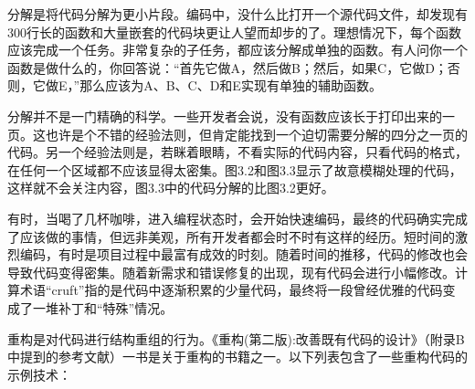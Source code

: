 
分解是将代码分解为更小片段。编码中，没什么比打开一个源代码文件，却发现有300行长的函数和大量嵌套的代码块更让人望而却步的了。理想情况下，每个函数应该完成一个任务。非常复杂的子任务，都应该分解成单独的函数。有人问你一个函数是做什么的，你回答说：“首先它做A，然后做B；然后，如果C，它做D；否则，它做E，”那么应该为A、B、C、D和E实现有单独的辅助函数。

分解并不是一门精确的科学。一些开发者会说，没有函数应该长于打印出来的一页。这也许是个不错的经验法则，但肯定能找到一个迫切需要分解的四分之一页的代码。另一个经验法则是，若眯着眼睛，不看实际的代码内容，只看代码的格式，在任何一个区域都不应该显得太密集。图3.2和图3.3显示了故意模糊处理的代码，这样就不会关注内容，图3.3中的代码分解的比图3.2更好。




有时，当喝了几杯咖啡，进入编程状态时，会开始快速编码，最终的代码确实完成了应该做的事情，但远非美观，所有开发者都会时不时有这样的经历。短时间的激烈编码，有时是项目过程中最富有成效的时刻。随着时间的推移，代码的修改也会导致代码变得密集。随着新需求和错误修复的出现，现有代码会进行小幅修改。计算术语“cruft”指的是代码中逐渐积累的少量代码，最终将一段曾经优雅的代码变成了一堆补丁和“特殊”情况。

重构是对代码进行结构重组的行为。《重构(第二版):改善既有代码的设计》（附录B中提到的参考文献）一书是关于重构的书籍之一。以下列表包含了一些重构代码的示例技术：

